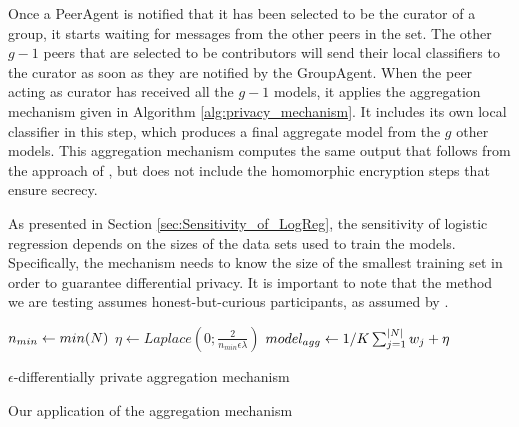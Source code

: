 Once a PeerAgent is notified that it has been selected to be the curator of a group, it starts waiting for messages from the other peers in the set. The other $g-1$ peers that are selected to be contributors will send their local classifiers to the curator as soon as they are notified by the GroupAgent. When the peer acting as curator has received all the $g-1$ models, it applies the aggregation mechanism given in Algorithm \ref{alg:privacy_mechanism}. It includes its own local classifier in this step, which produces a final aggregate model from the $g$ other models. This aggregation mechanism computes the same output that follows from the approach of \cite{pathak2010diffprivhomo}, but does not include the homomorphic encryption steps that ensure secrecy.

As presented in Section \ref{sec:Sensitivity_of_LogReg}, the sensitivity of logistic regression depends on the sizes of the data sets used to train the models. Specifically, the mechanism needs to know the size of the smallest training set in order to guarantee differential privacy. It is important to note that the method we are testing assumes honest-but-curious participants, as assumed by \cite{pathak2010diffprivhomo}.

\begin{algorithm}[H]
	
	$n_{min} \leftarrow min(\boldmath{N})$\;
	$\eta \leftarrow Laplace(0; \frac{2}{n_{min}\epsilon\lambda})$\;
	$model_{agg} \leftarrow 1/K\sum_{j=1}^{|\boldmath{N}|} \boldmath{w_j} + \boldmath{\eta}$\;
	
	\caption{$\epsilon$-differentially private aggregation mechanism}
	\label{alg:privacy_mechanism}
\end{algorithm}


\begin{algorithm}[H]
	\caption{Our application of the aggregation mechanism}
	\label{alg:aggregation_mechanism}
\end{algorithm}


